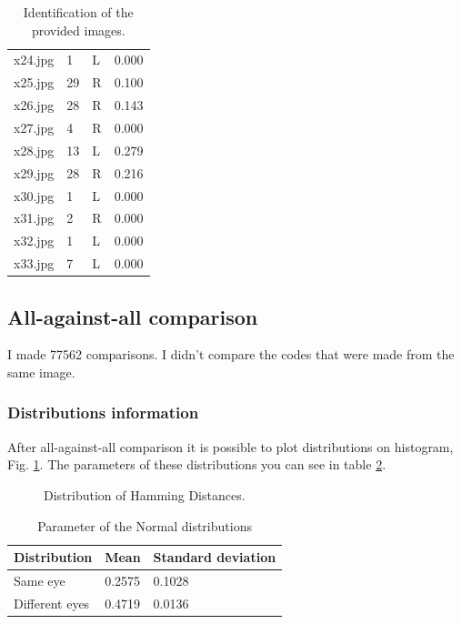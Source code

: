 \documentclass{article}
\begin{document}
\begin{table}[h]
\begin{tabular}{ |p{1.1cm}|p{1.6cm}|p{1.3cm}|p{0.8cm}|  }
    x24.jpg & 1         & L        & 0.000 \\ 
    x25.jpg & 29        & R        & 0.100 \\ 
    x26.jpg & 28        & R        & 0.143 \\ 
    x27.jpg & 4         & R        & 0.000 \\ 
    x28.jpg & 13        & L        & 0.279 \\ 
    x29.jpg & 28        & R        & 0.216 \\ 
    x30.jpg & 1         & L        & 0.000 \\ 
    x31.jpg & 2         & R        & 0.000 \\ 
    x32.jpg & 1         & L        & 0.000 \\ 
    x33.jpg & 7         & L        & 0.000 \\ 
    \hline              
  \end{tabular}  
  \caption{Identification of the provided images.}      
  \label{provided_images_identification} 
\end{table}



\subsection{All-against-all comparison}
I made 77562 comparisons. I didn't compare the codes that were made from the same image.
\subsubsection{Distributions information}
After all-against-all comparison it is possible to plot distributions on histogram, Fig. \ref{database_distributions}.
The parameters of these distributions you can see in table \ref{distributions_parameters}.

\begin{figure}[htbp] 
  \centering
  \def\svgscale{0.7}
  
  \caption{Distribution of Hamming Distances.}
  \label{database_distributions}
\end{figure}

\newpage



\begin{table}[h]
  \centering
  \begin{tabular}{ |p{2.3cm}|p{2cm}|p{3cm}|  }
    \hline
    Distribution   & Mean   & Standard deviation \\
    \hline
    Same eye       & 0.2575 & 0.1028             \\
    Different eyes & 0.4719 & 0.0136             \\
    \hline
  \end{tabular}   
  \caption{Parameter of the Normal distributions}  
  \label{distributions_parameters}
\end{table}
\end{document}
